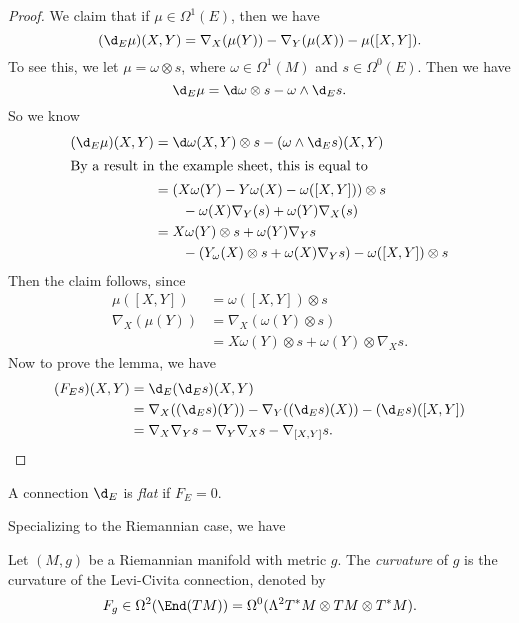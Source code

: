 \documentclass[a4paper]{article}
\begin{document}
\begin{proof}
  We claim that if $\mu \in \Omega^1(E)$, then we have
  \[
    (\d_E \mu) (X, Y) = \nabla_X (\mu(Y)) - \nabla_Y (\mu(X)) - \mu([X, Y]).
  \]
  To see this, we let $\mu = \omega \otimes s$, where $\omega \in \Omega^1(M)$ and $s \in \Omega^0(E)$. Then we have
  \[
    \d_E \mu = \d \omega \otimes s - \omega \wedge \d_E s.
  \]
  So we know
  \begin{align*}
    (\d_E \mu)(X, Y) &= \d \omega(X, Y) \otimes s - (\omega \wedge \d_E s)(X, Y)\\
    \intertext{By a result in the example sheet, this is equal to}
    &= (X \omega(Y) - Y \omega(X) - \omega([X, Y])) \otimes s \\
    &\quad\quad- \omega(X) \nabla_Y (s) + \omega(Y) \nabla_X(s)\\
    &= X \omega(Y) \otimes s + \omega(Y) \nabla_Y s \\
    &\quad \quad- (Y_\omega(X) \otimes s + \omega(X) \nabla_Y s) - \omega([X, Y]) \otimes s
  \end{align*}
  Then the claim follows, since
  \begin{align*}
    \mu([X, Y]) &= \omega([X, Y]) \otimes s\\
    \nabla_X(\mu(Y)) &= \nabla_X(\omega(Y) \otimes s)\\
    &= X \omega(Y) \otimes s + \omega(Y) \otimes \nabla_X s.
  \end{align*}
  Now to prove the lemma, we have
  \begin{align*}
    (F_E s)(X, Y) &= \d_E( \d_E s)(X, Y)\\
    &= \nabla_X((\d_E s)(Y)) - \nabla_Y((\d_E s)(X)) - (\d_E s)([X, Y])\\
    &= \nabla_X \nabla_Y s - \nabla_Y \nabla_X s - \nabla_{[X, Y]} s.
  \end{align*}
\end{proof}

\begin{defi}
  A connection $\d_E$ is \emph{flat} if $F_E = 0$.
\end{defi}

Specializing to the Riemannian case, we have
\begin{defi}
  Let $(M, g)$ be a Riemannian manifold with metric $g$. The \emph{curvature} of $g$ is the curvature of the Levi-Civita connection, denoted by
  \[
    F_g \in \Omega^2(\End(TM)) = \Omega^0(\Lambda^2 T^* M \otimes TM \otimes T^*M).
  \]
\end{defi}
\end{document}
